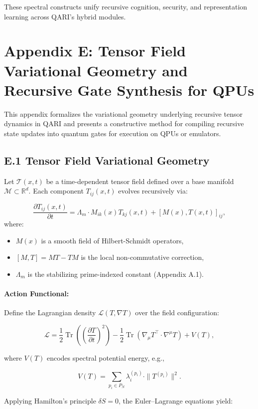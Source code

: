 \documentclass[12pt]{article}
\begin{document}
\begin{itemize}
These spectral constructs unify recursive cognition, security, and representation learning across QARI’s hybrid modules.


\section*{Appendix E: Tensor Field Variational Geometry and Recursive Gate Synthesis for QPUs}

This appendix formalizes the variational geometry underlying recursive tensor dynamics in QARI and presents a constructive method for compiling recursive state updates into quantum gates for execution on QPUs or emulators.

\subsection*{E.1 Tensor Field Variational Geometry}

Let \(\mathcal{T}(x,t)\) be a time-dependent tensor field defined over a base manifold \(\mathcal{M} \subset \mathbb{R}^d\). Each component \(T_{ij}(x,t)\) evolves recursively via:

\[
\frac{\partial T_{ij}(x,t)}{\partial t} = \Lambda_m \cdot M_{ik}(x) T_{kj}(x,t) + [M(x), T(x,t)]_{ij},
\]
where:
\begin{itemize}
    \item \(M(x)\) is a smooth field of Hilbert-Schmidt operators,
    \item \([M, T] = MT - TM\) is the local non-commutative correction,
    \item \(\Lambda_m\) is the stabilizing prime-indexed constant (Appendix A.1).
\end{itemize}

\paragraph{Action Functional:}
Define the Lagrangian density \(\mathcal{L}(T, \nabla T)\) over the field configuration:

\[
\mathcal{L} = \frac{1}{2} \operatorname{Tr} \left( \left( \frac{\partial T}{\partial t} \right)^2 \right) - \frac{1}{2} \operatorname{Tr} \left( \nabla_\mu T^\top \cdot \nabla^\mu T \right) + V(T),
\]

where \(V(T)\) encodes spectral potential energy, e.g.,

\[
V(T) = \sum_{p_i \in P_N} \lambda_i^{(p_i)} \cdot \|T^{(p_i)}\|^2.
\]

Applying Hamilton’s principle \(\delta S = 0\), the Euler–Lagrange equations yield:


\end{itemize}
\end{document}
